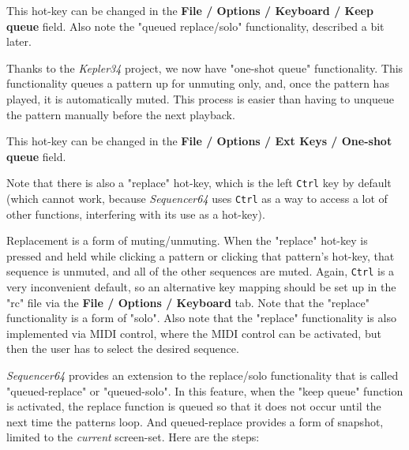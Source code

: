    This hot-key can be changed in the
   \textbf{File / Options / Keyboard / Keep queue} field.
   Also note the "queued replace/solo" functionality, described a bit later.

   Thanks to the \textsl{Kepler34} project, we now have "one-shot queue"
   functionality.  This functionality queues a pattern up for unmuting only,
   and, once the pattern has played, it is automatically muted.  This process
   is easier than having to unqueue the pattern manually before the next
   playback.

   This hot-key can be changed in the
   \textbf{File / Options / Ext Keys / One-shot queue} field.

   Note that there is also a "replace" hot-key, which is the left \texttt{Ctrl}
   key by default (which cannot work, because \textsl{Sequencer64} uses
   \texttt{Ctrl} as a way to access a lot of other functions, interfering with
   its use as a hot-key).

   Replacement is a form of muting/unmuting.  When the "replace" hot-key is
   pressed and held while clicking a pattern or clicking that pattern's
   hot-key, that sequence is unmuted, and all of the other sequences are muted.
   Again, \texttt{Ctrl}
   is a very inconvenient default, so an alternative key mapping
   should be set up in the "rc" file via the \textbf{File / Options / Keyboard}
   tab.  Note that the "replace" functionality is a form of "solo".  Also
   note that the "replace" functionality is also implemented via MIDI control,
   where the MIDI control can be activated, but then the user has to select
   the desired sequence.  

   \textsl{Sequencer64} provides an extension to the replace/solo functionality
   that is called "queued-replace" or "queued-solo".  In this feature, when
   the "keep queue" function is activated, the replace function is queued so
   that it does not occur until the next time the patterns loop.
   And queued-replace provides a form of snapshot, limited to the
   \textsl{current} screen-set.
   Here are the steps:

